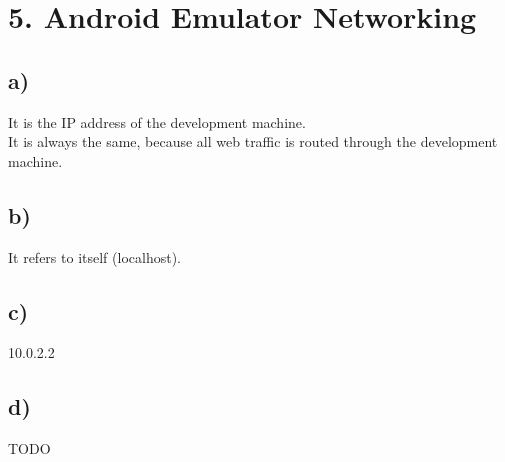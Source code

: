 \documentclass[10pt,a4paper]{article}
\begin{document}
		
	\section*{5. Android Emulator Networking}
		\subsection*{a)}
			It is the IP address of the development machine. \\
			It is always the same, because all web traffic is routed through the development machine. \\ 
			
		\subsection*{b)}
			It refers to itself (localhost). \\
			
		\subsection*{c)}
			10.0.2.2 \\
			
		\subsection*{d)}
			TODO \\
	
\end{document}
